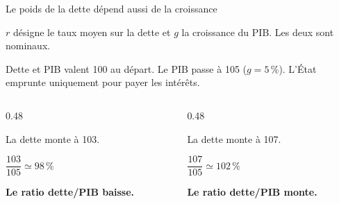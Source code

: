 \documentclass[aspectratio=169]{beamer}
\begin{document}
\begin{frame}{Le poids de la dette dépend aussi de la croissance}\examtag
   \small\raggedright
   \(r\) désigne le taux moyen sur la dette et \(g\) la croissance du PIB. Les deux sont nominaux.

   \smallskip
   Dette et PIB valent 100 au départ. Le PIB passe à 105 (\(g = 5\,\%\)). L’État emprunte uniquement pour payer les intérêts.

   \vspace{0.18cm}
   \begin{columns}[T,onlytextwidth]
      \begin{column}{0.48\textwidth}
         \begin{keyinsight}[\(r = 3\,\% < g\)]
            \centering
            La dette monte à 103.
            \par\smallskip
            \(\dfrac{103}{105} \simeq 98\,\%\)
            \par\smallskip
            \textbf{Le ratio dette/PIB baisse.}
         \end{keyinsight}
      \end{column}
      \begin{column}{0.48\textwidth}
         \begin{warning}[\(r = 7\,\% > g\)]
            \centering
            La dette monte à 107.
            \par\smallskip
            \(\dfrac{107}{105} \simeq 102\,\%\)
            \par\smallskip
            \textbf{Le ratio dette/PIB monte.}
         \end{warning}
      \end{column}
   \end{columns}
\end{frame}
\end{document}
